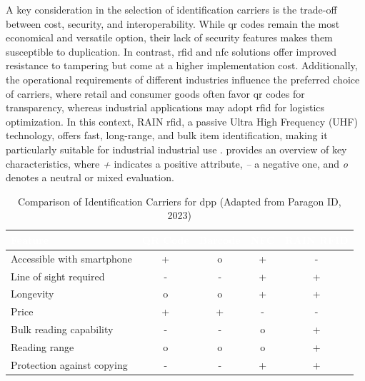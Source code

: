 A key consideration in the selection of identification carriers is the trade-off between cost, security, and interoperability. While \ac{qr} codes remain the most economical and versatile option, their lack of security features makes them susceptible to duplication. In contrast, \ac{rfid} and \ac{nfc} solutions offer improved resistance to tampering but come at a higher implementation cost. Additionally, the operational requirements of different industries influence the preferred choice of carriers, where retail and consumer goods often favor \ac{qr} codes for transparency, whereas industrial applications may adopt \ac{rfid} for logistics optimization. In this context, RAIN \ac{rfid}, a passive Ultra High Frequency (UHF) technology, offers fast, long-range, and bulk item identification, making it particularly suitable for industrial industrial use \autocite{TheRAINAlliance.n.d.}.  provides an overview of key characteristics, where \textit{+} indicates a positive attribute, \textit{–} a negative one, and \textit{o} denotes a neutral or mixed evaluation. \autocite{ParagonID.n.d.}

\begin{table}[htbp]
    \centering
    \caption{Comparison of Identification Carriers for \ac{dpp} (Adapted from Paragon ID, 2023)}
    \begin{tabularx}{\textwidth}{|X|c|c|c|c|}
        \hline
        \rowcolor{myDarkBlue} \textcolor{white}{\textbf{Feature}} & 
        \textcolor{white}{\textbf{QR Code}} & 
        \textcolor{white}{\textbf{Barcode}} & 
        \textcolor{white}{\textbf{NFC}} & 
        \textcolor{white}{\textbf{RAIN RFID}} \\
        \hline
        \rowcolor{lightgray!25} Accessible with smartphone & + & o & + & - \\
        \hline
        \rowcolor{myGrey} Line of sight required & - & - & + & + \\
        \hline
        \rowcolor{lightgray!25} Longevity & o & o & + & + \\
        \hline
        \rowcolor{myGrey} Price & + & + & - & - \\
        \hline
        \rowcolor{lightgray!25} Bulk reading capability & - & - & o & + \\
        \hline
        \rowcolor{myGrey} Reading range & o & o & o & + \\
        \hline
        \rowcolor{lightgray!25} Protection against copying & - & - & + & + \\
        \hline
    \end{tabularx}
    \label{tab:identifier_comparison}
\end{table}

